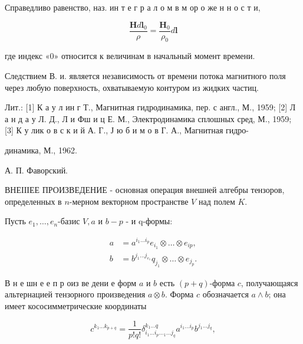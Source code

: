 \documentclass[10pt]{article}
\begin{document}
Справедливо равенство, наз. ин т е г р а л о м в м ор о же н н о с т и,



\[

\frac{\boldsymbol{H} d \boldsymbol{l}_{0}}{\rho}=\frac{\boldsymbol{H}_{0}}{\rho_{0}} d \boldsymbol{l}

\]



где индекс «0» относится к величинам в начальный момент времени.



Следствием В. и. является независимость от времени потока магнитного поля через любую поверхность, охватываемую контуром из жидких частиц.



Лит.: [1] К а у л ин г Т., Магнитная гидродинамика, пер. с англ., М., 1959; [2] Л а н д а у Л. Д., Л и Фш и ц Е. М., Электродинамика сплошных сред, М., 1959; [3] К у лик о в с к и й А. Г., Ј ю б и м о в Г. А., Магнитная гидро-

динамика, М., 1962.

А. П. Фаворский.



ВНЕІІІЕЕ ПРОИЗВЕДЕНИЕ - основная операция внешней алгебры тензоров, определенных в $n$-мерном векторном пространстве $V$ над полем $K$.



Пусть $e_{1}, \ldots, e_{n}$-базис $V, a$ и $b-p$ - и q-формы:



\[

\begin{aligned}

a & =a^{i_{1} \ldots i_{p}} e_{i_{1}} \otimes \ldots \otimes e_{i p}, \\

b & =b^{j_{1} \ldots j_{e_{1}}} q_{j_{1}} \otimes \ldots \otimes e_{j_{p}} .

\end{aligned}

\]



В н е шн е е п р оиз ве дени е форм $a$ и $b$ есть $(p+q)$-форма $c$, получающаяся альтернацией тензорного произведения $a \otimes b$. Форма $c$ обозначается $a \wedge b$; она имеет кососимметрические координаты



\[

c^{k_{1} \ldots k_{p+q}}=\frac{1}{p ! q !} \delta_{i_{1} \ldots i_{p} \ldots_{1} \ldots j_{q}}^{k_{1} \ldots q} a^{i_{1} \ldots i_{p}} b^{j_{1} \ldots j_{q}},

\]
\end{document}
